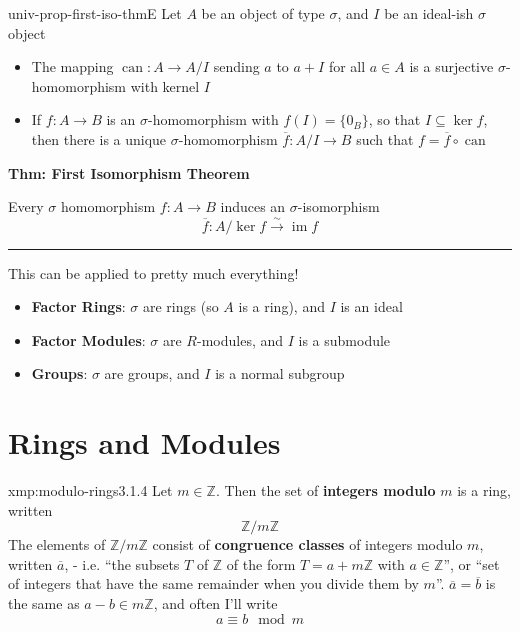 \documentclass[landscape, 8pt]{extarticle}
\DeclareMathOperator{\im}{im}
\DeclareMathOperator{\can}{can}
\begin{document}
\begin{multicols}{3}
\begin{thm}{univ-prop-first-iso-thm}{E}
    Let $A$ be an object of type $\sigma$, and $I$ be an ideal-ish $\sigma$ object
    \vspace{-5pt}
    \begin{itemize}
        \item The mapping $\can : A \to A /I$ sending $a$ to $a + I$ for all $a\in A$ is a surjective $\sigma$-homomorphism with kernel $I$
        \item If $f : A \to B$ is an $\sigma$-homomorphism with $f(I) = \{0_{B}\}$, so that $I\subseteq \ker f$, then there is a unique $\sigma$-homomorphism $\overline{f} : A / I \to B$ such that $f = \overline{f} \circ \can$
    \end{itemize}
    
    \vspace{-5pt}
    \textbf{Thm: First Isomorphism Theorem}

    Every $\sigma$ homomorphism $f : A \to B$ induces an $\sigma$-isomorphism
    \[\overline{f} : A / \ker f \xrightarrow{\sim} \im f\]

    \vspace{-5pt}
    \noindent\rule{\textwidth}{0.2pt}
    This can be applied to pretty much everything!
    \vspace{-5pt}
    \begin{itemize}[leftmargin=*]
        \setlength\itemsep{0em}
        \item \textbf{Factor Rings}: $\sigma$ are rings (so $A$ is a ring), and $I$ is an ideal
        \item \textbf{Factor Modules}: $\sigma$ are $R$-modules, and $I$ is a submodule
        \item \textbf{Groups}: $\sigma$ are groups, and $I$ is a normal subgroup
    \end{itemize}
\end{thm}


\newpage
\section{Rings and Modules}

\vspace{-5pt}
\begin{xmp}{xmp:modulo-rings}{3.1.4}
    \vspace{-5pt}
    Let $m\in \mathbb{Z}$. Then the set of \textbf{integers modulo} $m$ is a ring, written
    \[\mathbb{Z} / m\mathbb{Z}\]
     The elements of $\mathbb{Z} / m\mathbb{Z}$ consist of \textbf{congruence classes} of integers modulo $m$, written $\overline{a}$, - i.e. ``the subsets $T$ of $\mathbb{Z}$ of the form $T = a + m\mathbb{Z}$ with $a\in \mathbb{Z}$'', or ``set of integers that have the same remainder when you divide them by $m$''. $\overline{a} = \overline{b}$ is the same as $a-b\in m\mathbb{Z}$, and often I'll write
    \[a \equiv b \mod m\]


\end{xmp}
\end{multicols}
\end{document}
